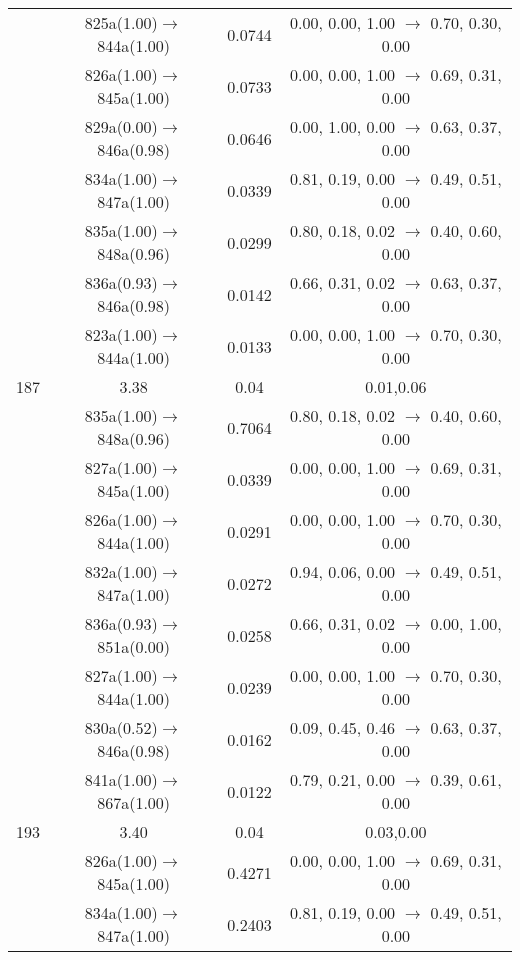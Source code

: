 \documentclass[10pt,a4paper]{article}
\begin{document}
\begin{longtable}{c|c|c|c}
 	& 825a(1.00)$\rightarrow$844a(1.00) &	 0.0744 &	 0.00, 0.00, 1.00 $\rightarrow$ 0.70, 0.30, 0.00 \\ 
 	& 826a(1.00)$\rightarrow$845a(1.00) &	 0.0733 &	 0.00, 0.00, 1.00 $\rightarrow$ 0.69, 0.31, 0.00 \\ 
 	& 829a(0.00)$\rightarrow$846a(0.98) &	 0.0646 &	 0.00, 1.00, 0.00 $\rightarrow$ 0.63, 0.37, 0.00 \\ 
 	& 834a(1.00)$\rightarrow$847a(1.00) &	 0.0339 &	 0.81, 0.19, 0.00 $\rightarrow$ 0.49, 0.51, 0.00 \\ 
 	& 835a(1.00)$\rightarrow$848a(0.96) &	 0.0299 &	 0.80, 0.18, 0.02 $\rightarrow$ 0.40, 0.60, 0.00 \\ 
 	& 836a(0.93)$\rightarrow$846a(0.98) &	 0.0142 &	 0.66, 0.31, 0.02 $\rightarrow$ 0.63, 0.37, 0.00 \\ 
 	& 823a(1.00)$\rightarrow$844a(1.00) &	 0.0133 &	 0.00, 0.00, 1.00 $\rightarrow$ 0.70, 0.30, 0.00 \\ 
 \hline187 &	 3.38 &	 0.04 &	 0.01,0.06 \\ 
  	& 835a(1.00)$\rightarrow$848a(0.96) &	 0.7064 &	 0.80, 0.18, 0.02 $\rightarrow$ 0.40, 0.60, 0.00 \\ 
 	& 827a(1.00)$\rightarrow$845a(1.00) &	 0.0339 &	 0.00, 0.00, 1.00 $\rightarrow$ 0.69, 0.31, 0.00 \\ 
 	& 826a(1.00)$\rightarrow$844a(1.00) &	 0.0291 &	 0.00, 0.00, 1.00 $\rightarrow$ 0.70, 0.30, 0.00 \\ 
 	& 832a(1.00)$\rightarrow$847a(1.00) &	 0.0272 &	 0.94, 0.06, 0.00 $\rightarrow$ 0.49, 0.51, 0.00 \\ 
 	& 836a(0.93)$\rightarrow$851a(0.00) &	 0.0258 &	 0.66, 0.31, 0.02 $\rightarrow$ 0.00, 1.00, 0.00 \\ 
 	& 827a(1.00)$\rightarrow$844a(1.00) &	 0.0239 &	 0.00, 0.00, 1.00 $\rightarrow$ 0.70, 0.30, 0.00 \\ 
 	& 830a(0.52)$\rightarrow$846a(0.98) &	 0.0162 &	 0.09, 0.45, 0.46 $\rightarrow$ 0.63, 0.37, 0.00 \\ 
 	& 841a(1.00)$\rightarrow$867a(1.00) &	 0.0122 &	 0.79, 0.21, 0.00 $\rightarrow$ 0.39, 0.61, 0.00 \\ 
 \hline193 &	 3.40 &	 0.04 &	 0.03,0.00 \\ 
  	& 826a(1.00)$\rightarrow$845a(1.00) &	 0.4271 &	 0.00, 0.00, 1.00 $\rightarrow$ 0.69, 0.31, 0.00 \\ 
 	& 834a(1.00)$\rightarrow$847a(1.00) &	 0.2403 &	 0.81, 0.19, 0.00 $\rightarrow$ 0.49, 0.51, 0.00 \\ 

\end{longtable}
\end{document}
